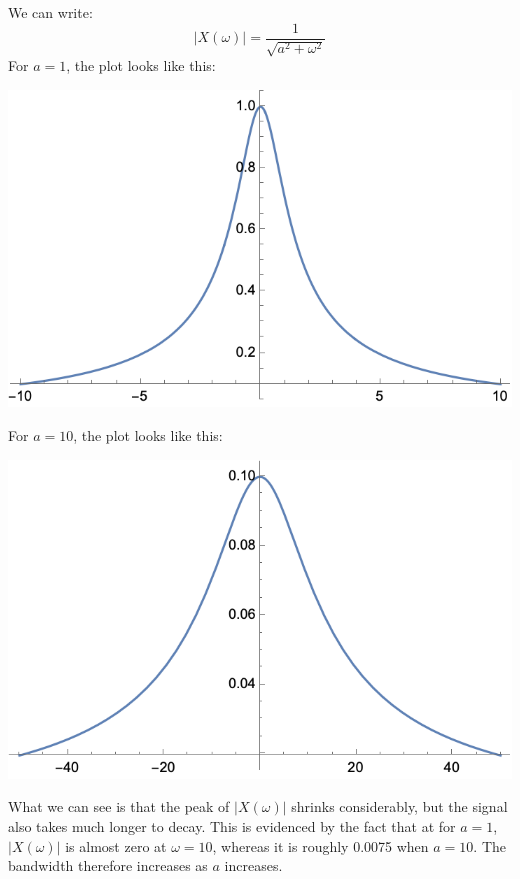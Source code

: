 \documentclass[10pt]{article}
\begin{document}
\begin{enumerate}[label=\alph*)]
			\begin{solution}
				We can write:
				\[
				|X(\omega)| = \frac{1}{\sqrt{a^2 + \omega^2} }
				\] 
				For \( a =1 \), the plot looks like this: 
				\begin{center}
					\includegraphics[scale=0.8]{q2a1.png}
				\end{center}
				For \( a = 10 \), the plot looks like this:
				\begin{center}
					\includegraphics[scale=0.8]{q2a2.png}
				\end{center}
				What we can see is that the peak of \( |X(\omega)| \) shrinks considerably, but the signal also 
				takes much longer to decay. This is evidenced by the fact that at for 
				\( a = 1 \), \( |X(\omega)| \) is almost zero at \( \omega = 10 \), whereas it is roughly 
				0.0075 when \( a = 10 \). The bandwidth therefore increases as \( a \) increases. 


\end{solution}
\end{enumerate}
\end{document}

